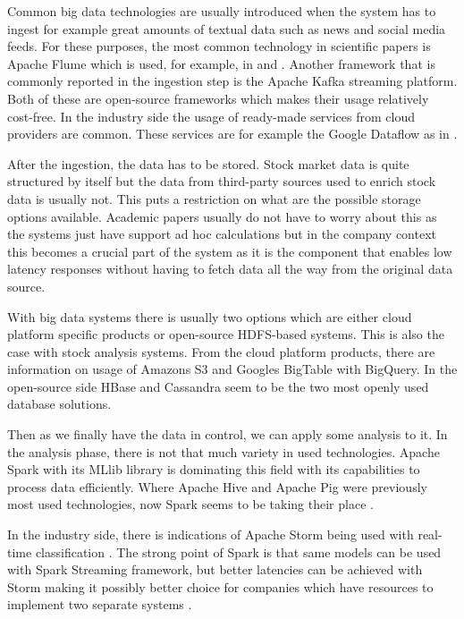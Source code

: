 Common big data technologies are usually introduced when the system has to ingest for example great amounts of textual data such as news and social media feeds.
For these purposes, the most common technology in scientific papers is Apache Flume which is used, for example, in \cite{peng} and \cite{das}.
Another framework that is commonly reported in the ingestion step is the Apache Kafka streaming platform. \cite{chungho} \cite{juan}
Both of these are open-source frameworks which makes their usage relatively cost-free.
In the industry side the usage of ready-made services from cloud providers are common.
These services are for example the Google Dataflow as in \cite{palmer}.

After the ingestion, the data has to be stored.
Stock market data is quite structured by itself but the data from third-party sources used to enrich stock data is usually not.
This puts a restriction on what are the possible storage options available.
Academic papers usually do not have to worry about this as the systems just have support ad hoc calculations but in the company context this becomes a crucial part of the system as it is the component that enables low latency responses without having to fetch data all the way from the original data source.

With big data systems there is usually two options which are either cloud platform specific products or open-source HDFS-based systems.
This is also the case with stock analysis systems.
From the cloud platform products, there are information on usage of Amazons S3 and Googles BigTable with BigQuery. \cite{snively} \cite{palmer}
In the open-source side HBase \cite{gu} and Cassandra seem to be the two most openly used database solutions.

Then as we finally have the data in control, we can apply some analysis to it.
In the analysis phase, there is not that much variety in used technologies.
Apache Spark with its MLlib library is dominating this field with its capabilities to process data efficiently. \cite{islam} \cite{chen} \cite{chungho} \cite{adresic}
Where Apache Hive and Apache Pig were previously most used technologies, now Spark seems to be taking their place \cite{snively}.

In the industry side, there is indications of Apache Storm being used with real-time classification \cite{juan}.
The strong point of Spark is that same models can be used with Spark Streaming framework, but better latencies can be achieved with Storm making it possibly better choice for companies which have resources to implement two separate systems \cite{kumar}.

